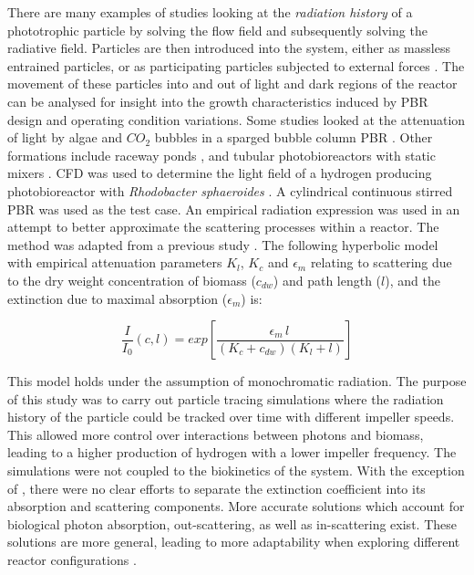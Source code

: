 There are many examples of studies looking at the \textit{radiation history} of a phototrophic particle by solving the flow field and subsequently solving the radiative field. Particles are then introduced into the system, either as massless entrained particles, or as participating particles subjected to external forces \cite{zhang2013}. The movement of these particles into and out of light and dark regions of the reactor can be analysed for insight into the growth characteristics induced by PBR design and operating condition variations. Some studies looked at the attenuation of light by algae and $CO_2$ bubbles in a sparged bubble column PBR \cite{hochhalter2014}. Other formations include raceway ponds \cite{gharagozloo2014,Park2015}, and tubular photobioreactors with static mixers \cite{cheng2016}. CFD was used to determine the light field of a hydrogen producing photobioreactor with \textit{Rhodobacter sphaeroides} \cite{krujatz2015}. A cylindrical continuous stirred PBR was used as the test case. An empirical radiation expression was used in an attempt to better approximate the scattering processes within a reactor. The method was adapted from a previous study \cite{suh2003}. The following hyperbolic model with empirical attenuation parameters $K_l$, $K_c$ and $\epsilon_m$ relating to scattering due to the dry weight concentration of biomass ($c_{dw}$) and path length ($l$), and the extinction due to maximal absorption ($\epsilon_m$) is:


\begin{equation} 
\frac{I}{I_0} (c,l) = exp \left[\frac{\epsilon_m \, l \, }{(K_c + c_{dw})(K_l + l)}\right]
\end{equation}

This model holds under the assumption of monochromatic radiation. The purpose of this study was to carry out particle tracing simulations where the radiation history of the particle could be tracked over time with different impeller speeds. This allowed more control over interactions between photons and biomass, leading to a higher production of hydrogen with a lower impeller frequency. The simulations were not coupled to the biokinetics of the system. With the exception of \cite{gharagozloo2014,krujatz2015}, there were no clear efforts to separate the extinction coefficient into its absorption and scattering components. More accurate solutions which account for biological photon absorption, out-scattering, as well as in-scattering exist. These solutions are more general, leading to more adaptability when exploring different reactor configurations \cite{ho2009}.


